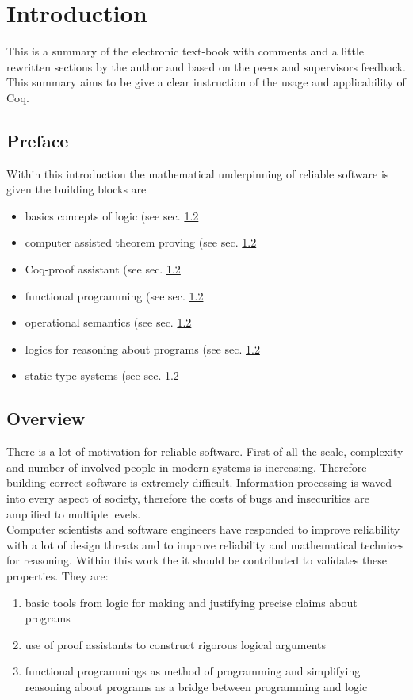 \section{Introduction}

This is a summary of the electronic text-book \cite{PACGGHSY} with comments and a little rewritten sections by the author and based on the peers and supervisors feedback.
This summary aims to be give a clear instruction of the usage and applicability of Coq.\\

\subsection{Preface}
Within this introduction the mathematical underpinning of reliable software is given the building blocks are
\begin{itemize}
\item basics concepts of logic (see sec. \ref{} %
\item computer assisted theorem proving (see sec. \ref{} %
\item Coq-proof assistant (see sec. \ref{} %
\item functional programming (see sec. \ref{} %
\item operational semantics (see sec. \ref{} %
\item logics for reasoning about programs (see sec. \ref{} %
\item static type systems (see sec. \ref{} %
\end{itemize} 

\subsection{Overview}
There is a lot of motivation for reliable software. 
First of all the scale, complexity and number of involved people in modern systems is increasing.
Therefore building correct software is extremely difficult.
Information processing is waved into every aspect of society, therefore the costs of bugs and insecurities are amplified to multiple levels.\\
Computer scientists and software engineers have responded to improve reliability with a lot of design threats and to improve reliability and mathematical technices for reasoning.
Within this work the it should be contributed to validates these properties. They are:
\begin{enumerate}
\item basic tools from logic for making and justifying precise claims about programs
\item use of proof assistants to construct rigorous logical arguments
\item functional programmings as method of programming and simplifying reasoning about programs as a bridge between programming and logic
\end{enumerate}



